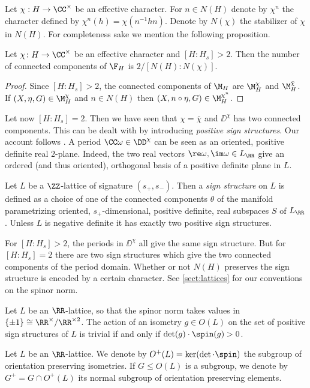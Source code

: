 Let $\chi: H \to \CC^\times$ be an effective character. For $n \in N(H)$ denote by
$\chi^n$ the character defined by $\chi^n(h) = \chi(n^{-1} h n)$.
Denote by $N(\chi)$ the stabilizer of $\chi$ in $N(H)$. For completeness sake we mention the following proposition.

\begin{proposition}
 Let $\chi \colon H \to \CC^\times$ be an effective character and $[H:H_s]>2$.
 Then the number of connected components of $\F_H$ is $2/[N(H):N(\chi)]$.
\end{proposition}
\begin{proof}
 Since $[H:H_s]>2$, the connected components of $\M_H$ are $\M_H^\chi$ and $\M_H^{\bar \chi}$. If $(X,\eta,G) \in \M_H^\chi$ and $n \in N(H)$ then $(X,n \circ \eta,G) \in \M_H^{\chi^n}$.
\end{proof}

Let now $[H:H_s]=2$. Then we have seen that $\chi=\bar \chi$ and $\DD^\chi$ has two connected components.
This can be dealt with by introducing \emph{positive sign structures}. Our account follows \cite{shimada2018}.
A period $\CC \omega \in \DD^\chi$ can be seen as an oriented, positive definite real $2$-plane. Indeed, the two real vectors $\re \omega, \im \omega \in L_\RR$ give an ordered (and thus oriented), orthogonal basis of a positive definite plane in $L$.

\begin{definition}
 Let $L$ be a $\ZZ$-lattice of signature $(s_+,s_-)$. Then a \emph{sign structure} on $L$ is defined as a choice of one of the connected components $\theta$ of the manifold parametrizing oriented, $s_+$-dimensional, positive definite, real subspaces $S$ of $L_\RR$. Unless $L$ is negative definite it has exactly two positive sign structures.
\end{definition}

For $[H:H_s]>2$, the periods in $\DD^\chi$ all give the same sign structure. But for $[H:H_s]=2$ there are two sign structures which give the two connected components of the period domain.
Whether or not $N(H)$ preserves the sign structure is encoded by a certain character. See \cref{sect:lattices} for our conventions on the spinor norm.
\begin{proposition}
 Let $L$ be an $\RR$-lattice, so that the spinor norm takes values in $\{\pm 1\}\cong \RR^\times/\RR^{\times 2}$.
 The action of an isometry $g \in O(L)$ on the set of positive sign structures of $L$ is trivial if and only if $\det(g) \cdot \spin(g) > 0$.
\end{proposition}
Let $L$ be an $\RR$-lattice. We denote by $O^+(L)=\ker (\det \cdot \spin)$ the subgroup of orientation preserving isometries. If $G \leq O(L)$ is a subgroup, we denote by $G^+ = G \cap O^+(L)$ its normal subgroup of orientation preserving elements.

